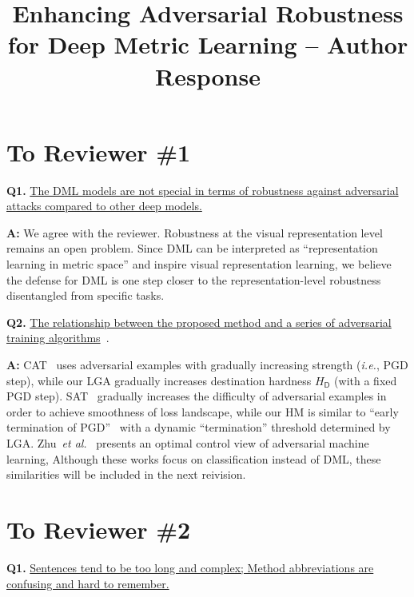 \documentclass[10pt,twocolumn,letterpaper]{article}
\begin{document}
\title{Enhancing Adversarial Robustness for Deep Metric Learning -- Author Response}  %

\maketitle
\thispagestyle{empty}
\appendix

\section*{To Reviewer \#1}

\noindent\textbf{Q1.}
%
\ul{
The DML models are not special in terms of robustness against
adversarial attacks compared to other deep models.
}

\noindent\textbf{A:} 
%
We agree with the reviewer. Robustness at the visual representation level
remains an open problem. Since DML can be interpreted as ``representation
learning in metric space'' and inspire visual representation learning, we
believe the defense for DML is one step closer to the representation-level
robustness disentangled from specific tasks.

\noindent\textbf{Q2.}
%
\ul{
The relationship between the proposed method and a series of
adversarial training algorithms}~\cite{smoothat,currat,optcontrolaml}.

\noindent\textbf{A:}
%
CAT~\cite{currat} uses adversarial examples with gradually increasing strength
(\emph{i.e.}, PGD step), while our LGA gradually increases destination hardness
$H_\mathsf{D}$ (with a fixed PGD step).
%
SAT~\cite{smoothat} gradually increases the difficulty of adversarial examples
in order to achieve smoothness of loss landscape, while our HM is similar to
``early termination of PGD''~\cite{smoothat} with a dynamic ``termination''
threshold determined by LGA.
%
Zhu~\emph{et al.}~\cite{optcontrolaml} presents an optimal control view of
adversarial machine learning,
%
Although these works focus on classification instead of DML, these similarities
will be included in the next reivision.


\section*{To Reviewer \#2}

\noindent\textbf{Q1.}
%
\ul{
Sentences tend to be too long and complex; Method abbreviations are confusing
and hard to remember.
}
\end{document}
